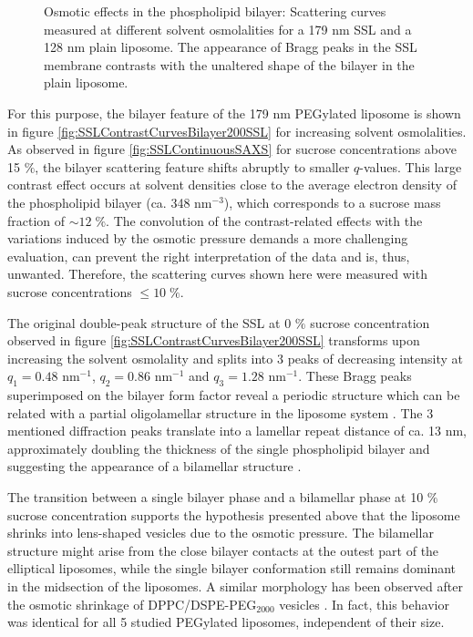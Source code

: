 \begin{figure}
	\centering
		\subfloat[PEG 179 nm]{\resizebox{0.44\linewidth}{!}{}\label{fig:SSLContrastCurvesBilayer200SSL}}
		\subfloat[Plain 128 nm]{\resizebox{0.44\linewidth}{!}{}\label{fig:SSLContrastCurvesBilayer100Plain}}
		\caption[Osmotic effects in the phospholipid bilayer.]{Osmotic effects in the phospholipid bilayer: Scattering curves measured at different solvent osmolalities for a 179 nm SSL and a 128 nm plain liposome. The appearance of Bragg peaks in the SSL membrane contrasts with the unaltered shape of the bilayer in the plain liposome.}
\end{figure}

For this purpose, the bilayer feature of the 179 nm PEGylated liposome is shown in figure \ref{fig:SSLContrastCurvesBilayer200SSL} for increasing solvent osmolalities. As observed in figure \ref{fig:SSLContinuousSAXS} for sucrose concentrations above 15 $\%$, the bilayer scattering feature shifts abruptly to smaller $q$-values. This large contrast effect occurs at solvent densities close to the average electron density of the phospholipid bilayer (ca. 348 nm$^{-3}$), which corresponds to a sucrose mass fraction of $\sim 12 \; \%$. The convolution of the contrast-related effects with the variations induced by the osmotic pressure demands a more challenging evaluation, can prevent the right interpretation of the data and is, thus, unwanted. Therefore, the scattering curves shown here were measured with sucrose concentrations $\leq10\;\%$.

The original double-peak structure of the SSL at 0 $\%$ sucrose concentration observed in figure \ref{fig:SSLContrastCurvesBilayer200SSL} transforms upon increasing the solvent osmolality and splits into 3 peaks of decreasing intensity at $q_1=0.48$ nm$^{-1}$, $q_2=0.86$ nm$^{-1}$ and $q_3=1.28$ nm$^{-1}$. These Bragg peaks superimposed on the bilayer form factor reveal a periodic structure which can be related with a partial oligolamellar structure in the liposome system \citep{fernandez_influence_2008}. The 3 mentioned diffraction peaks translate into a lamellar repeat distance of ca. 13 nm, approximately doubling the thickness of the single phospholipid bilayer \citep{kenworthy_range_1995} and suggesting the appearance of a bilamellar structure \citep{deme_giant_2002}. 

The transition between a single bilayer phase and a bilamellar phase at 10 $\%$ sucrose concentration supports the hypothesis presented above that the liposome shrinks into lens-shaped vesicles due to the osmotic pressure. The bilamellar structure might arise from the close bilayer contacts at the outest part of the elliptical liposomes, while the single bilayer conformation still remains dominant in the midsection of the liposomes. A similar morphology has been observed after the osmotic shrinkage of DPPC/DSPE-PEG$_{2000}$ vesicles \citep{terreno_osmotically_2009}. In fact, this behavior was identical for all 5 studied PEGylated liposomes, independent of their size. 

